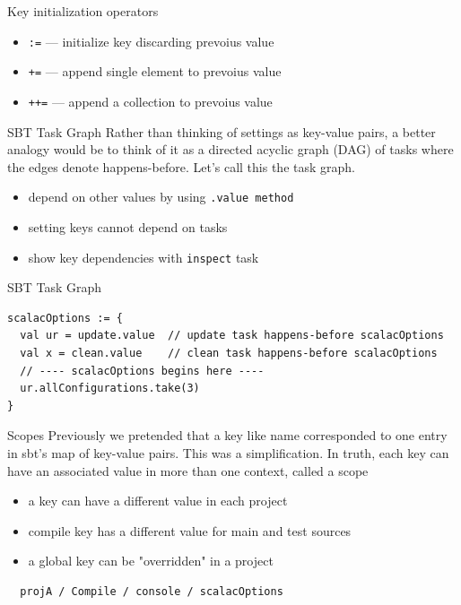 \documentclass[aspectratio=169]{beamer}
\begin{document}
\begin{frame}{Key initialization operators}
\begin{itemize}
  \item \texttt{:=} --- initialize key discarding prevoius value
  \item \texttt{+=} --- append single element to prevoius value
  \item \texttt{++=} --- append a collection to prevoius value
\end{itemize}
\end{frame}

\begin{frame}[fragile]{SBT Task Graph}
Rather than thinking of settings as key-value pairs, a better analogy would be to think of it as a
directed acyclic graph (DAG) of tasks where the edges denote happens-before. Let’s call this the
task graph.

\begin{itemize}
  \item depend on other values by using \texttt{.value method}
  \item setting keys cannot depend on tasks
  \item show key dependencies with \texttt{inspect} task
\end{itemize}
\end{frame}

\begin{frame}[fragile]{SBT Task Graph}
\begin{verbatim}
scalacOptions := {
  val ur = update.value  // update task happens-before scalacOptions
  val x = clean.value    // clean task happens-before scalacOptions
  // ---- scalacOptions begins here ----
  ur.allConfigurations.take(3)
}
\end{verbatim}
\end{frame}

\begin{frame}[fragile]{Scopes}
Previously we pretended that a key like name corresponded to one entry in sbt’s map of key-value
pairs. This was a simplification.
In truth, each key can have an associated value in more than one context, called a scope
\begin{itemize}
  \item a key can have a different value in each project
  \item compile key has a different value for main and test sources
  \item a global key can be "overridden" in a project
\end{itemize}
\vspace{1em}
\begin{center}
  \begin{verbatim}
  projA / Compile / console / scalacOptions
  \end{verbatim}
\end{center}
\end{frame}
\end{document}
